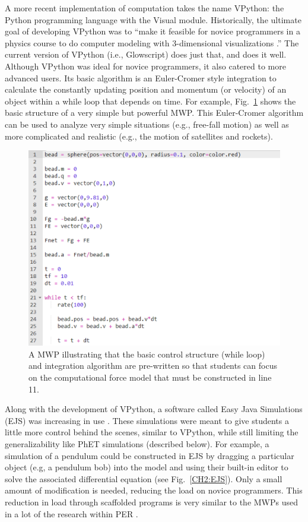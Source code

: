 \documentclass{msuphddissertation}
\begin{document}
\begin{doublespace}
A more recent implementation of computation takes the name VPython: the Python programming language with the Visual module.  Historically, the ultimate goal of developing VPython was to ``make it feasible for novice programmers in a physics course to do computer modeling with 3-dimensional visualizations \cite{Sherer2000}.''  The current version of VPython (i.e., Glowscript) does just that, and does it well.  Although VPython was ideal for novice programmers, it also catered to more advanced users.  Its basic algorithm is an Euler-Cromer style integration to calculate the constantly updating position and momentum (or velocity) of an object within a while loop that depends on time.  For example, Fig.~\ref{CH2:MWP} shows the basic structure of a very simple but powerful MWP.  This Euler-Cromer algorithm can be used to analyze very simple situations (e.g., free-fall motion) as well as more complicated and realistic (e.g., the motion of satellites and rockets).

\begin{figure}\center
\includegraphics[scale=0.60]{images/CH2MWP.pdf}
\caption{A MWP illustrating that the basic control structure (while loop) and integration algorithm are pre-written so that students can focus on the computational force model that must be constructed in line 11.}\label{CH2:MWP}
\end{figure}

Along with the development of VPython, a software called Easy Java Simulations (EJS) was increasing in use \cite{Esquembre2005}.  These simulations were meant to give students a little more control behind the scenes, similar to VPython, while still limiting the generalizability like PhET simulations (described below).  For example, a simulation of a pendulum could be constructed in EJS by dragging a particular object (e.g, a pendulum bob) into the model and using their built-in editor to solve the associated differential equation (see Fig.~\ref{CH2:EJS}).  Only a small amount of modification is needed, reducing the load on novice programmers.  This reduction in load through scaffolded programs is very similar to the MWPs used in a lot of the research within PER \cite{Weatherford2011}.


\end{doublespace}
\end{document}
